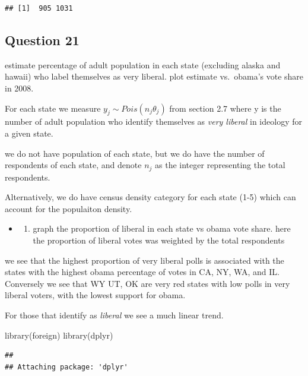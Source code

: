 \documentclass[
]{book}
\newenvironment{Shaded}{\begin{snugshade}}{\end{snugshade}}
\newcommand{\FunctionTok}[1]{\textcolor[rgb]{0.00,0.00,0.00}{#1}}
\newcommand{\NormalTok}[1]{#1}
\providecommand{\tightlist}{%
  \setlength{\itemsep}{0pt}\setlength{\parskip}{0pt}}
\theoremstyle{definition}
\theoremstyle{definition}
\theoremstyle{definition}
\theoremstyle{definition}
\theoremstyle{remark}
\begin{document}
\begin{verbatim}
## [1]  905 1031
\end{verbatim}

\hypertarget{question-21}{%
\subsection{Question 21}\label{question-21}}

estimate percentage of adult population in each state (excluding alaska and hawaii) who label themselves as very liberal. plot estimate vs.~obama's vote share in 2008.

For each state we measure \(y_j\sim Pois(n_j\theta_j)\) from section 2.7 where y is the number of adult population who identify themselves as \emph{very liberal} in ideology for a given state.

we do not have population of each state, but we do have the number of respondents of each state, and denote \(n_j\) as the integer representing the total respondents.

Alternatively, we do have census density category for each state (1-5) which can account for the populaiton density.

\begin{itemize}
\item
  \begin{enumerate}
  \def\labelenumi{(\alph{enumi})}
  \tightlist
  \item
    graph the proportion of liberal in each state vs obama vote share. here the proportion of liberal votes was weighted by the total respondents
  \end{enumerate}
\end{itemize}

we see that the highest proportion of very liberal polls is associated with the states with the highest obama percentage of votes in CA, NY, WA, and IL. Conversely we see that WY UT, OK are very red states with low polls in very liberal voters, with the lowest support for obama.

For those that identify as \emph{liberal} we see a much linear trend.

\begin{Shaded}
\begin{Highlighting}[]
 \FunctionTok{library}\NormalTok{(foreign)}
 \FunctionTok{library}\NormalTok{(dplyr)}
\end{Highlighting}
\end{Shaded}

\begin{verbatim}
## 
## Attaching package: 'dplyr'
\end{verbatim}
\end{document}
